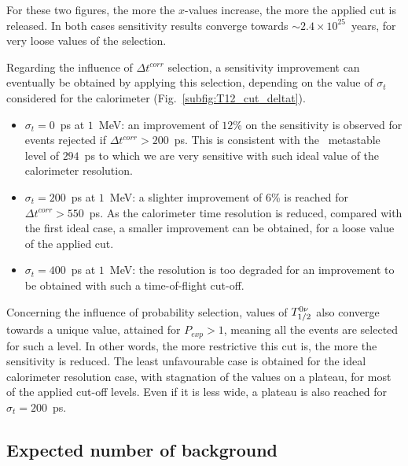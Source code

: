 For these two figures, the more the $x$-values increase, the more the applied cut is released.
In both cases sensitivity results converge towards $\sim2.4\times10^{25}$~years, for very loose values of the selection.

Regarding the influence of $\Delta t^{corr}$ selection, a sensitivity improvement can eventually be obtained by applying this selection, depending on the value of $\sigma_{t}$ considered for the calorimeter (Fig.~\ref{subfig:T12_cut_deltat}).
\begin{itemize}
\item $\sigma_{t}=0$~ps at $1$~MeV: an improvement of $12$\% on the sensitivity is observed for events rejected if $\Delta t^{corr}>200$~ps.
  This is consistent with the \Pb\ metastable level of $294$~ps to which we are very sensitive with such ideal value of the calorimeter resolution.
\item $\sigma_{t}=200$~ps at $1$~MeV: a slighter improvement of $6$\% is reached for $\Delta t^{corr}>550$~ps.
  As the calorimeter time resolution is reduced, compared with the first ideal case, a smaller improvement can be obtained, for a loose value of the applied cut.
\item $\sigma_{t}=400$~ps at $1$~MeV: the resolution is too degraded for an improvement to be obtained with such a time-of-flight cut-off.
\end{itemize}

Concerning the influence of probability selection, values of $T_{1/2}^{0\nu}$ also converge towards a unique value, attained for $P_{exp}>1$, meaning all the events are selected for such a level.
In other words, the more restrictive this cut is, the more the sensitivity is reduced.
The least unfavourable case is obtained for the ideal calorimeter resolution case, with stagnation of the values on a plateau, for most of the applied cut-off levels.
Even if it is less wide, a plateau is also reached for $\sigma_{t}=200$~ps.


\subsection{Expected number of background}


